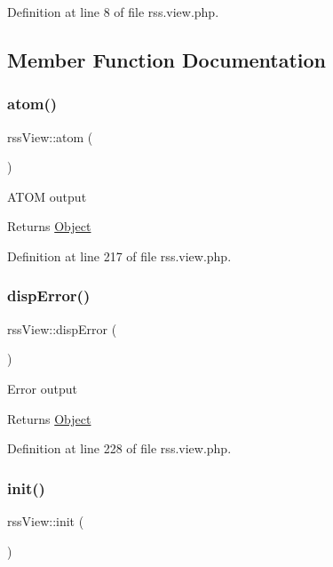Definition at line 8 of file rss.\+view.\+php.



\subsection{Member Function Documentation}
\hypertarget{classrssView_a4c0453c52a946c2fe3643e099235eb62}{}\label{classrssView_a4c0453c52a946c2fe3643e099235eb62} 
\subsubsection{\texorpdfstring{atom()}{atom()}}
{\footnotesize\ttfamily rss\+View\+::atom (\begin{DoxyParamCaption}{ }\end{DoxyParamCaption})}

A\+T\+OM output

\begin{DoxyReturn}{Returns}
\hyperlink{classObject}{Object} 
\end{DoxyReturn}


Definition at line 217 of file rss.\+view.\+php.

\hypertarget{classrssView_a1e6808d03030aa6f6ff61083798c2422}{}\label{classrssView_a1e6808d03030aa6f6ff61083798c2422} 
\subsubsection{\texorpdfstring{disp\+Error()}{dispError()}}
{\footnotesize\ttfamily rss\+View\+::disp\+Error (\begin{DoxyParamCaption}{ }\end{DoxyParamCaption})}

Error output

\begin{DoxyReturn}{Returns}
\hyperlink{classObject}{Object} 
\end{DoxyReturn}


Definition at line 228 of file rss.\+view.\+php.

\hypertarget{classrssView_af438b469cdde5b47ced8ada179d56c4d}{}\label{classrssView_af438b469cdde5b47ced8ada179d56c4d} 
\subsubsection{\texorpdfstring{init()}{init()}}
{\footnotesize\ttfamily rss\+View\+::init (\begin{DoxyParamCaption}{ }\end{DoxyParamCaption})}

